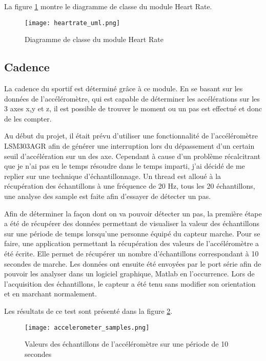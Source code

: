 La figure \ref{fig:heartrate_uml} montre le diagramme de classe du module Heart Rate.

\begin{figure}[htb]
\centering 
\texttt{[image: heartrate\_uml.png]} 
\caption{Diagramme de classe du module Heart Rate}
\label{fig:heartrate_uml}
\end{figure}

\subsection{Cadence}

La cadence du sportif est déterminé grâce à ce module. En se basant sur les données de l'accéléromètre, qui est capable de déterminer les accélérations sur les 3 axes x,y et z, il est possible de trouver le moment ou un pas est effectué et donc de les compter. 

Au début du projet, il était prévu d'utiliser une fonctionnalité de l'accéléromètre LSM303AGR afin de générer une interruption lors du dépassement d'un certain seuil d'accélération sur un des axe. Cependant à cause d'un problème récalcitrant que je n'ai pas eu le temps résoudre dans le temps imparti, j'ai décidé de me replier sur une technique d'échantillonnage. Un thread est alloué à la récupération des échantillons à une fréquence de 20 Hz, tous les 20 échantillons, une analyse des sample est faite afin d'essayer de détecter un pas.

Afin de déterminer la façon dont on va pouvoir détecter un pas, la première étape a été de récupérer des données permettant de visualiser la valeur des échantillons sur une période de temps lorsqu'une personne équipé du capteur marche. Pour se faire, une application permettant la récupération des valeurs de l'accéléromètre a été écrite. Elle permet de récupérer un nombre d'échantillons correspondant à 10 secondes de marche. Les données ont ensuite été envoyées par le port série afin de pouvoir les analyser dans un logiciel graphique, Matlab en l'occurrence. Lors de l'acquisition des échantillons, le capteur a été tenu sans modifier son orientation et en marchant normalement.

Les résultats de ce test sont présenté dans la figure \ref{fig:graph_accel}.

\begin{figure}[htb]
\centering 
\texttt{[image: accelerometer\_samples.png]} 
\caption{Valeurs des échantillons de l'accéléromètre sur une période de 10 secondes}
\label{fig:graph_accel}
\end{figure}

